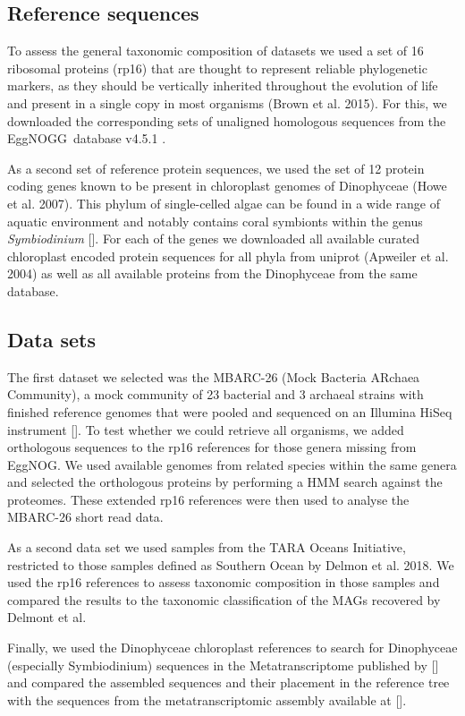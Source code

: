 \documentclass{bioinfo}
\newcommand{\eggnog}{EggNOGG}
\begin{document}
\begin{methods}
\subsection{Reference sequences}
To assess the general taxonomic composition of datasets we used a set of 16 ribosomal proteins (rp16) that are thought to represent reliable phylogenetic markers, as they should be vertically inherited throughout the evolution of life and present in a single copy in most organisms (Brown et al. 2015). For this, we downloaded the corresponding sets of unaligned homologous sequences from the \eggnog\ database v4.5.1 \cite[][see Table SXXX]{huerta-cepas_eggnog_2016}.

As a second set of reference protein sequences, we used the set of 12 protein coding genes known to be present in chloroplast genomes of Dinophyceae (Howe et al. 2007). This phylum of single-celled algae can be found in a wide range of aquatic environment and notably contains coral symbionts within the genus \textit{Symbiodinium} []. For each of the genes we downloaded all available curated chloroplast encoded protein sequences for all phyla from uniprot (Apweiler et al. 2004) as well as all available proteins from the Dinophyceae from the same database.

\subsection{Data sets}
The first dataset we selected was the MBARC-26 (Mock Bacteria ARchaea Community), a mock community of 23 bacterial and 3 archaeal strains with finished reference genomes that were pooled and sequenced on an Illumina HiSeq instrument []. To test whether we could retrieve all organisms, we added orthologous sequences to the rp16 references for those genera missing from EggNOG. We used available genomes from related species within the same genera and selected the orthologous proteins by performing a HMM search against the proteomes. These extended rp16 references were then used to analyse the MBARC-26 short read data. 

As a second data set we used samples from the TARA Oceans Initiative, restricted to those samples defined as Southern Ocean by Delmon et al. 2018. We used the rp16 references to assess taxonomic composition in those samples and compared the results to the taxonomic classification of the MAGs recovered by Delmont et al.

Finally, we used the Dinophyceae chloroplast references to search for Dinophyceae (especially Symbiodinium) sequences in the Metatranscriptome published by [] and compared the assembled sequences and their placement in the reference tree with the sequences from the metatranscriptomic assembly available at [].


\end{methods}
\end{document}
